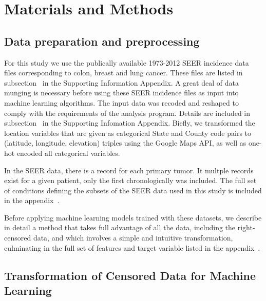 \documentclass[10pt,letterpaper]{article}
\begin{document}
\section*{Materials and Methods}
\label{sec:materialsandmethods}

 


\subsection*{Data preparation and preprocessing}
\label{subsec:dataprep} 

For this study we use the publically available 1973-2012 SEER incidence data files corresponding to colon, breast and lung cancer. These files are listed in subsection~ in the Supporting Information Appendix.
A great deal of data munging is necessary before using these SEER incidence files as input into machine learning algorithms. 
The input data was recoded and reshaped to comply with the requirements of the analysis program. Details are included in subsection~ in the Supporting Infomation Appendix. Biefly, we transformed the location variables that are given as categorical State and County code pairs
to (latitude, longitude, elevation) triples using the Google Maps API, as well as one-hot encoded all categorical variables.


In the SEER data, there is a record for each primary tumor. It multple records exist for a given patient, only the first chronologically was included. The full set of conditions defining the subsets of the SEER data used in this study is included in the appendix~.




Before applying machine learning models trained with these datasets, we describe in detail a method that takes full advantage of all the data, including the right-censored data, and which involves a simple and intuitive transformation, culminating in the full set of features and target variable listed in the appendix~. 



\subsection*{Transformation of Censored Data for Machine Learning}
\label{subsec:transformation}
\end{document}
